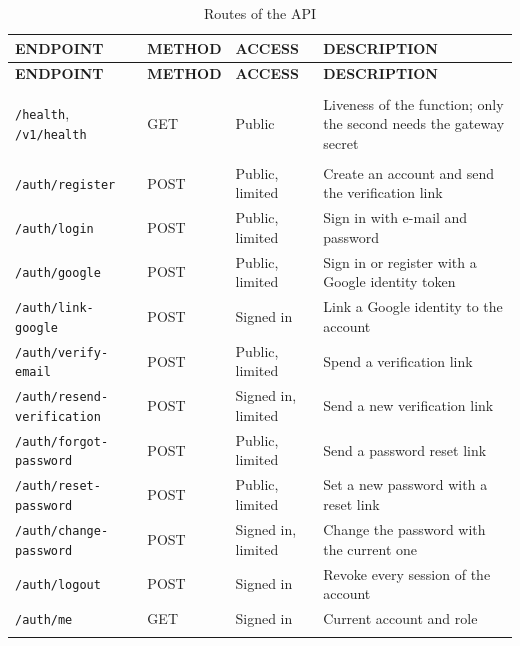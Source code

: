 \begin{footnotesize}
\setlength{\tabcolsep}{4pt}
\begin{longtable}{>{\raggedright\arraybackslash}p{} >{\raggedright\arraybackslash}p{} >{\raggedright\arraybackslash}p{} >{\raggedright\arraybackslash}p{}}
\caption{Routes of the API}\label{tab:api-reference}\\
\toprule
\textbf{ENDPOINT} & \textbf{METHOD} & \textbf{ACCESS} & \textbf{DESCRIPTION} \\
\midrule
\endfirsthead
\toprule
\textbf{ENDPOINT} & \textbf{METHOD} & \textbf{ACCESS} & \textbf{DESCRIPTION} \\
\midrule
\endhead
\bottomrule
\endfoot
\multicolumn{4}{l}{\textit{Health}} \\
\texttt{/health}, \texttt{/v1/health} & GET & Public & Liveness of the function; only the second needs the gateway secret \\
\midrule
\multicolumn{4}{l}{\textit{Accounts}} \\
\texttt{/auth/register} & POST & Public, limited & Create an account and send the verification link \\
\texttt{/auth/login} & POST & Public, limited & Sign in with e-mail and password \\
\texttt{/auth/google} & POST & Public, limited & Sign in or register with a Google identity token \\
\texttt{/auth/link-google} & POST & Signed in & Link a Google identity to the account \\
\texttt{/auth/verify-email} & POST & Public, limited & Spend a verification link \\
\texttt{/auth/resend-verification} & POST & Signed in, limited & Send a new verification link \\
\texttt{/auth/forgot-password} & POST & Public, limited & Send a password reset link \\
\texttt{/auth/reset-password} & POST & Public, limited & Set a new password with a reset link \\
\texttt{/auth/change-password} & POST & Signed in, limited & Change the password with the current one \\
\texttt{/auth/logout} & POST & Signed in & Revoke every session of the account \\
\texttt{/auth/me} & GET & Signed in & Current account and role \\
\midrule
\multicolumn{4}{l}{\textit{Uploads}} \\

\end{longtable}
\end{footnotesize}
